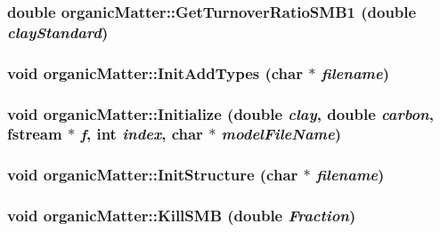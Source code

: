 \label{classorganic_matter_a0796a73dd50dd9cf1d97bf8a5de3d3a4}
\hypertarget{classorganic_matter_a7f207a5cc9b81af56393be25209e0bde}{
\subsubsection[{GetTurnoverRatioSMB1}]{\setlength{\rightskip}{0pt plus 5cm}double organicMatter::GetTurnoverRatioSMB1 (double {\em clayStandard})}}
\label{classorganic_matter_a7f207a5cc9b81af56393be25209e0bde}
\hypertarget{classorganic_matter_acf0fae55b68d6d0845d20fcfdd1638b4}{
\subsubsection[{InitAddTypes}]{\setlength{\rightskip}{0pt plus 5cm}void organicMatter::InitAddTypes (char $\ast$ {\em filename})}}
\label{classorganic_matter_acf0fae55b68d6d0845d20fcfdd1638b4}
\hypertarget{classorganic_matter_af7bf4f5a06da9f6c4977c56d1bbb17ef}{
\subsubsection[{Initialize}]{\setlength{\rightskip}{0pt plus 5cm}void organicMatter::Initialize (double {\em clay}, \/  double {\em carbon}, \/  fstream $\ast$ {\em f}, \/  int {\em index}, \/  char $\ast$ {\em modelFileName})}}
\label{classorganic_matter_af7bf4f5a06da9f6c4977c56d1bbb17ef}
\hypertarget{classorganic_matter_a571a15d4863954c5f1f2adbaca71e9bf}{
\subsubsection[{InitStructure}]{\setlength{\rightskip}{0pt plus 5cm}void organicMatter::InitStructure (char $\ast$ {\em filename})}}
\label{classorganic_matter_a571a15d4863954c5f1f2adbaca71e9bf}
\hypertarget{classorganic_matter_ae6148352b9c917d7c35e7452d4d62449}{
\subsubsection[{KillSMB}]{\setlength{\rightskip}{0pt plus 5cm}void organicMatter::KillSMB (double {\em Fraction})}}
